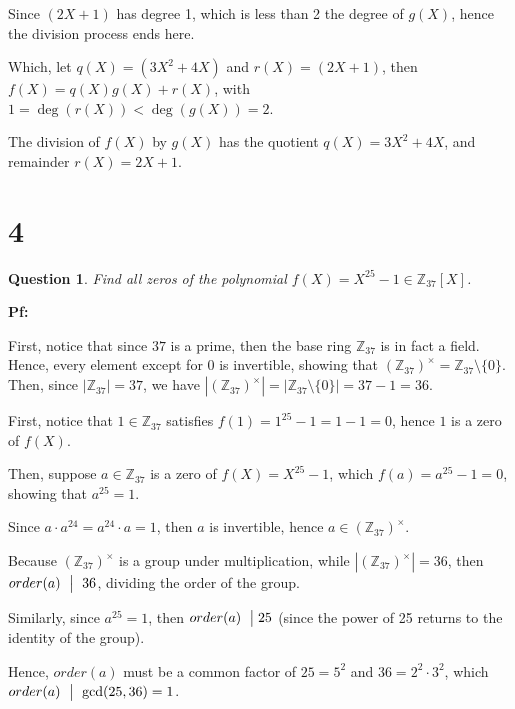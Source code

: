 \documentclass{article}
\newtheorem{question}{Question}
\begin{document}
\hfill

\hfill

Since $(2X+1)$ has degree 1, which is less than 2 the degree of $g(X)$, hence the division process ends here.

Which, let $q(X)=(3X^2+4X)$ and $r(X)=(2X+1)$, then $f(X)=q(X)g(X)+r(X)$, with $1=\deg(r(X))< \deg(g(X))=2$.

The division of $f(X)$ by $g(X)$ has the quotient $q(X)=3X^2+4X$, and remainder $r(X)=2X+1$.

\break

\section*{4}
\begin{myBox}[]{}
    \begin{question}
        Find all zeros of the polynomial $f(X)=X^{25}-1 \in \mathbb{Z}_{37}[X]$.
    \end{question}
\end{myBox}

\textbf{Pf:}

First, notice that since $37$ is a prime, then the base ring $\mathbb{Z}_{37}$ is in fact a field.
Hence, every element except for $0$ is invertible, showing that $(\mathbb{Z}_{37})^\times = \mathbb{Z}_{37}\setminus\{0\}$.
Then, since $|\mathbb{Z}_{37}| = 37$, we have $|(\mathbb{Z}_{37})^\times| = |\mathbb{Z}_{37}\setminus\{0\}| = 37-1 = 36$.

\hfill

First, notice that $1\in\mathbb{Z}_{37}$ satisfies $f(1)=1^{25}-1 = 1-1 = 0$, hence $1$ is a zero of $f(X)$.

\hfill

Then, suppose $a\in\mathbb{Z}_{37}$ is a zero of $f(X)=X^{25}-1$, which $f(a)=a^{25}-1 = 0$, showing that $a^{25}=1$.

Since $a\cdot a^{24} = a^{24}\cdot a=1$, then $a$ is invertible, hence $a\in(\mathbb{Z}_{37})^\times$.

Because $(\mathbb{Z}_{37})^\times$ is a group under multiplication, while $|(\mathbb{Z}_{37})^\times| = 36$, then $order(a)\ \bigm |\ 36$, 
dividing the order of the group.

Similarly, since $a^{25}=1$, then $order(a)\ \bigm | 25$ (since the power of 25 returns to the identity of the group).

Hence, $order(a)$ must be a common factor of $25 = 5^2$ and $36 = 2^2\cdot 3^2$, which $order(a)\ \bigm |\ \gcd(25,36)=1$.
\end{document}
